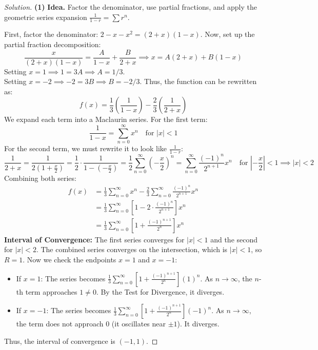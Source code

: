 \documentclass[11pt]{article}
\theoremstyle{definition}
\newenvironment{solution}{\begin{proof}[Solution]}{\end{proof}}
\begin{document}
\begin{solution}
\textbf{(1)} \textbf{Idea.} Factor the denominator, use partial fractions, and apply the geometric series expansion $\frac{1}{1-r} = \sum r^n$.

First, factor the denominator: $2-x-x^2 = (2+x)(1-x)$.
Now, set up the partial fraction decomposition:
\[
\frac{x}{(2+x)(1-x)} = \frac{A}{1-x} + \frac{B}{2+x} \implies x = A(2+x) + B(1-x)
\]
Setting $x=1 \implies 1 = 3A \implies A = 1/3$. \\
Setting $x=-2 \implies -2 = 3B \implies B = -2/3$.
Thus, the function can be rewritten as:
\[
f(x) = \frac{1}{3}\left( \frac{1}{1-x} \right) - \frac{2}{3}\left( \frac{1}{2+x} \right)
\]
We expand each term into a Maclaurin series.
For the first term:
\[
\frac{1}{1-x} = \sum_{n=0}^{\infty} x^n \quad \text{for } |x| < 1
\]
For the second term, we must rewrite it to look like $\frac{1}{1-r}$:
\[
\frac{1}{2+x} = \frac{1}{2(1 + \frac{x}{2})} = \frac{1}{2} \cdot \frac{1}{1 - (-\frac{x}{2})} = \frac{1}{2} \sum_{n=0}^{\infty} \left(-\frac{x}{2}\right)^n = \sum_{n=0}^{\infty} \frac{(-1)^n}{2^{n+1}} x^n \quad \text{for } \left|-\frac{x}{2}\right| < 1 \implies |x| < 2
\]
Combining both series:
\begin{align*}
f(x) &= \frac{1}{3} \sum_{n=0}^{\infty} x^n - \frac{2}{3} \sum_{n=0}^{\infty} \frac{(-1)^n}{2^{n+1}} x^n \\
&= \frac{1}{3} \sum_{n=0}^{\infty} \left[ 1 - 2 \cdot \frac{(-1)^n}{2^{n+1}} \right] x^n \\
&= \frac{1}{3} \sum_{n=0}^{\infty} \left[ 1 + \frac{(-1)^{n+1}}{2^n} \right] x^n
\end{align*}
\textbf{Interval of Convergence:} 
The first series converges for $|x| < 1$ and the second for $|x| < 2$. The combined series converges on the intersection, which is $|x| < 1$, so $R = 1$.
Now we check the endpoints $x=1$ and $x=-1$:
\begin{itemize}
    \item If $x=1$: The series becomes $\frac{1}{3} \sum_{n=0}^{\infty} \left[ 1 + \frac{(-1)^{n+1}}{2^n} \right] (1)^n$. As $n \to \infty$, the $n$-th term approaches $1 \neq 0$. By the Test for Divergence, it diverges.
    \item If $x=-1$: The series becomes $\frac{1}{3} \sum_{n=0}^{\infty} \left[ 1 + \frac{(-1)^{n+1}}{2^n} \right] (-1)^n$. As $n \to \infty$, the term does not approach 0 (it oscillates near $\pm 1$). It diverges.
\end{itemize}
Thus, the interval of convergence is $(-1, 1)$.


\end{solution}
\end{document}
